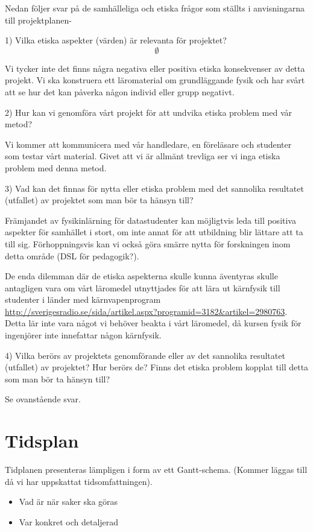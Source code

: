 \documentclass[12pt,a4paper]{article}
\begin{document}
Nedan följer svar på de samhälleliga och etiska frågor som ställts i anvisningarna till projektplanen-

1) Vilka etiska  aspekter (värden) är relevanta för projektet?
\[
\emptyset
\]

Vi tycker inte det finns några negativa eller positiva etiska konsekvenser av detta projekt. Vi ska konstruera ett läromaterial om grundläggande fysik och har svårt att se hur det kan påverka någon individ eller grupp negativt.

2) Hur kan vi genomföra vårt projekt för att undvika etiska problem med vår metod?

Vi kommer att kommunicera med vår handledare, en föreläsare och studenter som testar vårt material. Givet att vi är allmänt trevliga ser vi inga etiska problem med denna metod.

3) Vad kan det finnas för nytta eller etiska problem med det sannolika resultatet (utfallet) av projektet som man bör ta hänsyn till?

Främjandet av fysikinlärning för datastudenter kan möjligtvis leda till positiva aspekter för samhället i stort, om inte annat för att utbildning blir lättare att ta till sig. Förhoppningsvis kan vi också göra smärre nytta för forskningen inom detta område (DSL för pedagogik?).

De enda dilemman där de etiska aspekterna skulle kunna äventyras skulle antagligen vara om vårt läromedel utnyttjades för att lära ut kärnfysik till studenter i länder med kärnvapenprogram \url{http://sverigesradio.se/sida/artikel.aspx?programid=3182&artikel=2980763}.
   Detta lär inte vara något vi behöver beakta i vårt läromedel, då kursen fysik för ingenjörer inte innefattar någon kärnfysik.

4)  Vilka berörs av projektets genomförande eller av det sannolika resultatet (utfallet) av projektet? Hur berörs de? Finns det etiska problem kopplat till detta som man bör ta hänsyn till?

Se ovanstående svar.

\section{Tidsplan}

Tidplanen presenteras lämpligen i form av ett Gantt-schema.
(Kommer läggas till då vi har uppskattat tidsomfattningen).

\begin{itemize}
    \item Vad är när saker ska göras
    \item Var konkret och detaljerad
\end{itemize}
\end{document}
